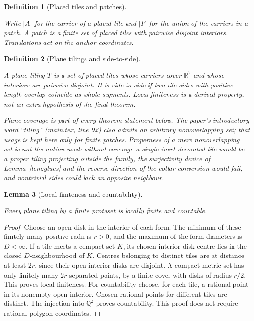 \documentclass[11pt,a4paper]{article}
\newcommand{\R}{\mathbb R}
\newtheorem{definition}{Definition}[section]
\newtheorem{lemma}[definition]{Lemma}
\theoremstyle{remark}
\newcommand{\lean}[1]{}
\newcommand{\uses}[1]{}
\begin{document}
\begin{definition}[Placed tiles and patches]\label{def:placed}
\lean{Tilings.PlacedTile,Tilings.Patch}
\uses{def:protoset}
Write $|A|$ for the carrier of a placed tile and $|F|$ for the union of the
carriers in a patch. A patch is a finite set of placed tiles with pairwise
disjoint interiors. Translations act on the anchor coordinates.
\end{definition}

\begin{definition}[Plane tilings and side-to-side]\label{def:tiling}
\lean{Tilings.PlaneTiling,Tilings.SideToSide}
\uses{def:placed}
A plane tiling $T$ is a set of placed tiles whose carriers cover $\R^2$ and
whose interiors are pairwise disjoint. It is side-to-side if two tile sides
with positive-length overlap coincide as whole segments. Local finiteness
is a derived property, not an extra hypothesis of the final theorem.

\emph{Plane coverage is part of every theorem statement below.} The
paper's introductory word ``tiling'' (main.tex, line 92) also admits an
arbitrary nonoverlapping set; that usage is kept here only for finite
patches. Properness of a mere nonoverlapping set is not the notion used:
without coverage a single inert decorated tile would be a proper tiling
projecting outside the family, the surjectivity device of
Lemma~\ref{lem:glues} and the reverse direction of the collar conversion
would fail, and nontrivial sides could lack an opposite neighbour.
\end{definition}

\begin{lemma}[Local finiteness and countability]\label{lem:localfinite}
\lean{Tilings.PlaneTiling.locallyFinite,Tilings.PlaneTiling.countable}
\uses{def:tiling}
Every plane tiling by a finite protoset is locally finite and countable.
\end{lemma}
\begin{proof}
Choose an open disk in the interior of each form. The minimum of these
finitely many positive radii is $r>0$, and the maximum of the form diameters
is $D<\infty$. If a tile meets a compact set $K$, its chosen interior disk
centre lies in the closed $D$-neighbourhood of $K$. Centres belonging to
distinct tiles are at distance at least $2r$, since their open interior
disks are disjoint. A compact metric set has only finitely many
$2r$-separated points, by a finite cover with disks of radius $r/2$.
This proves local finiteness.
For countability choose, for each tile, a rational point in its nonempty
open interior. Chosen rational points for different tiles are distinct.
The injection into $\mathbb Q^2$ proves countability. This proof does not
require rational polygon coordinates.
\end{proof}
\end{document}
